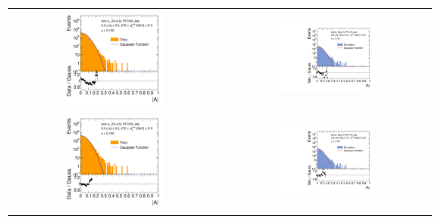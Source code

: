 \begin{figure}[!htp]   
  \centering
  \begin{tabular}{cc}
                \includegraphics[width=0.49\textwidth]{figures/AsymmHistosDataWithRatio_Eta0_pt5_alpha2_final_nominal_NoTruncation_v4.pdf} &
                \includegraphics[width=0.49\textwidth]{figures/AsymmHistosSimWithRatio_Eta0_pt5_alpha2_final_nominal_NoTruncation_v4b.pdf} \\ 
                \includegraphics[width=0.49\textwidth]{figures/AsymmHistosDataWithRatio_Eta0_pt5_alpha2_final_nominal_v4.pdf} &
                \includegraphics[width=0.49\textwidth]{figures/AsymmHistosSimWithRatio_Eta0_pt5_alpha2_final_nominal_v4b.pdf} \\

\end{tabular}
\end{figure}
